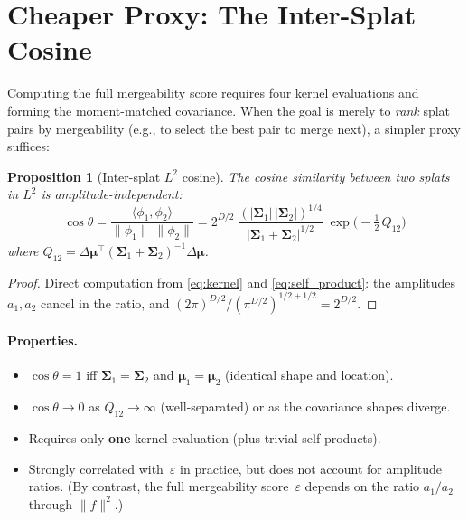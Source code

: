 \documentclass[11pt, a4paper]{article}
\theoremstyle{plain}
\newtheorem{proposition}[theorem]{Proposition}
\theoremstyle{definition}
\theoremstyle{remark}
\newcommand{\bmu}{\bm{\mu}}
\newcommand{\Sig}{\bm{\Sigma}}
\begin{document}
\section{Cheaper Proxy: The Inter-Splat Cosine}\label{sec:cosine}

Computing the full mergeability score requires four kernel evaluations
and forming the moment-matched covariance.  When the goal is merely to
\emph{rank} splat pairs by mergeability (e.g., to select the best
pair to merge next), a simpler proxy suffices:

\begin{proposition}[Inter-splat $L^2$ cosine]\label{prop:cosine}
The cosine similarity between two splats in $L^2$ is
amplitude-independent:
\begin{equation}\label{eq:cosine}
\boxed{
  \cos\theta
  = \frac{\langle\phi_1, \phi_2\rangle}
         {\|\phi_1\|\;\|\phi_2\|}
  = 2^{D/2}\;
    \frac{(|\Sig_1|\,|\Sig_2|)^{1/4}}
         {|\Sig_1 + \Sig_2|^{1/2}}\;
    \exp\!\bigl(-\tfrac{1}{2}\,Q_{12}\bigr)
}
\end{equation}
where $Q_{12} = \Delta\bmu^\top(\Sig_1 + \Sig_2)^{-1}\Delta\bmu$.
\end{proposition}

\begin{proof}
Direct computation from \eqref{eq:kernel} and \eqref{eq:self_product}:
the amplitudes $a_1, a_2$ cancel in the ratio, and
$(2\pi)^{D/2}/(\pi^{D/2})^{1/2 + 1/2} = 2^{D/2}$.
\end{proof}

\paragraph{Properties.}
\begin{itemize}
\item $\cos\theta = 1$ iff $\Sig_1 = \Sig_2$ and $\bmu_1 = \bmu_2$
  (identical shape and location).
\item $\cos\theta \to 0$ as $Q_{12} \to \infty$ (well-separated)
  or as the covariance shapes diverge.
\item Requires only \textbf{one} kernel evaluation (plus trivial
  self-products).
\item Strongly correlated with~$\varepsilon$ in practice, but does not
  account for amplitude ratios.  (By contrast, the full mergeability
  score~$\varepsilon$ depends on the ratio $a_1/a_2$ through $\|f\|^2$.)
\end{itemize}
\end{document}
